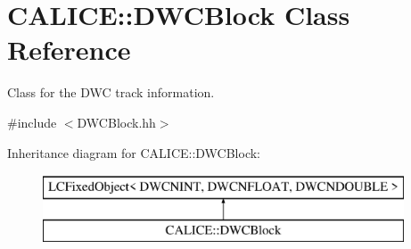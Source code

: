 \section{C\-A\-L\-I\-C\-E\-:\-:D\-W\-C\-Block Class Reference}
\label{classCALICE_1_1DWCBlock}


Class for the D\-W\-C track information.  




{\ttfamily \#include $<$D\-W\-C\-Block.\-hh$>$}

Inheritance diagram for C\-A\-L\-I\-C\-E\-:\-:D\-W\-C\-Block\-:\begin{figure}[H]
\begin{center}
\leavevmode
\includegraphics[height=2.000000cm]{classCALICE_1_1DWCBlock}
\end{center}
\end{figure}
